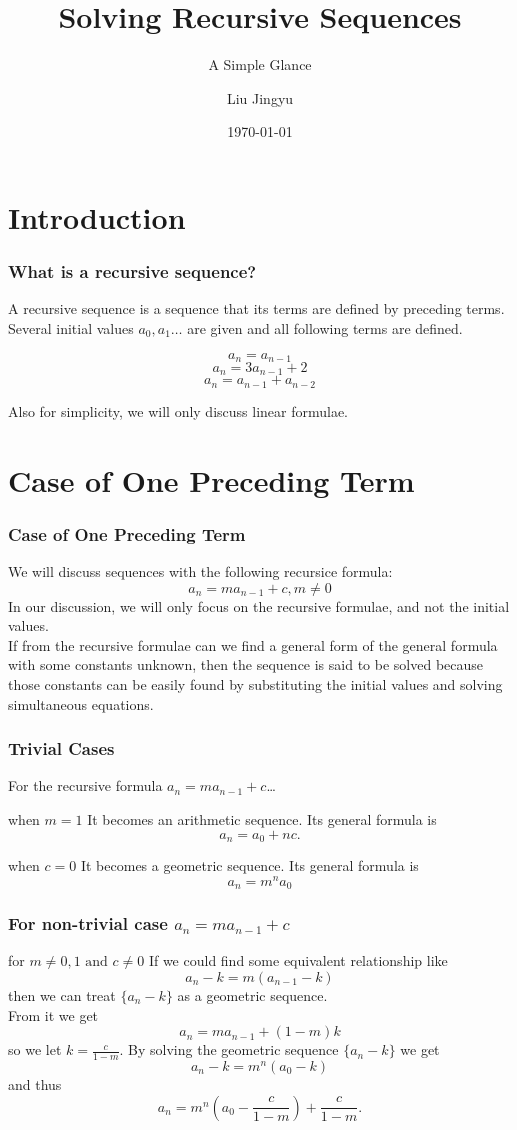 \documentclass{beamer}
\title{Solving Recursive Sequences}
\subtitle{A Simple Glance}
\author{Liu Jingyu}
\date{\today}
\theoremstyle{definition}
\theoremstyle{remark}
\begin{document}
\frame{\titlepage}
\section{Introduction}
\begin{frame}
  \frametitle{What is a recursive sequence?}
  A recursive sequence is a sequence that its 
  terms are defined by preceding terms. Several 
  initial values $a_0, a_1 \dots$ are given and 
  all following terms are defined. 
  \begin{examples}
     \[
       a_n = a_{n-1}
     \]
     \[
       a_n = 3a_{n-1} + 2
     \]
     \[
       a_n = a_{n-1} + a_{n-2}
     \]
  \end{examples}
Also for simplicity, we will only discuss linear
formulae.
\end{frame}
\section{Case of One Preceding Term}
\begin{frame}
  \frametitle{Case of One Preceding Term}
We will discuss sequences with the following 
recursice formula: \[
  a_n = m a_{n-1} + c, m \neq 0
\]
In our discussion, we will only focus on the 
recursive formulae, and not the initial values. 
\\
If from the recursive formulae can we find a general 
form of the general formula with some constants 
  unknown, then the sequence is said to be solved
  because those constants can be easily found by 
  substituting the initial values and solving 
  simultaneous equations. 

\end{frame}
\begin{frame}
  \frametitle{Trivial Cases}
For the recursive formula  $a_n = m a_{n-1} + c$\dots
  \begin{block}{when $m = 1$}
   It becomes an arithmetic sequence. 
   Its general formula is \[
    a_n = a_0 + nc.
   \]
\end{block}
  \begin{block}{when $c = 0$}
  It becomes a geometric sequence. 
    Its general formula is \[
      a_n =  m^n a_0
    \]
\end{block}
\end{frame}
\begin{frame}
  \frametitle{For non-trivial case $a_n = ma_{n-1} + c$}
  \begin{block}{for $m\neq 0, 1 \text{ and } c \neq 0$}
     If we could find some equivalent relationship like \[
       a_n - k = m(a_{n-1} - k) \]
     then we can treat $\{a_n - k\}$ as a geometric sequence. 
     \\
     From it
     we get \[
       a_n = ma_{n-1}+(1-m) k 
     \]
     so we let \(
       k = \frac{c}{1 - m}.
     \)
     By solving the geometric sequence 
     $\{a_n - k\}$ we get \[
       a_n - k = m^n (a_0 - k)
     \] and thus \[
      a_n = m^n (a_0 - \frac{c}{1 - m}) + \frac{c}{1 - m}.
     \]

   \end{block}
\end{frame}
\end{document}
